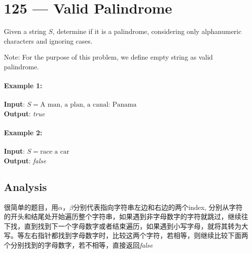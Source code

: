 \section{125 --- Valid Palindrome}
Given a string $S$, determine if it is a palindrome, considering only alphanumeric characters and ignoring cases.
\par
Note: For the purpose of this problem, we define empty string as valid palindrome.
\paragraph{Example 1:}
\begin{flushleft}
\textbf{Input}: $S=\text{A man, a plan, a canal: Panama}$
\\
\textbf{Output}: \textit{true}
\end{flushleft}
\paragraph{Example 2:}
\begin{flushleft}
\textbf{Input}: $S=\text{race a car}$
\\
\textbf{Output}: \textit{false}
\end{flushleft}
\subsection{Analysis}
\begin{CJK*}{UTF8}{gbsn}
很简单的题目，用$\alpha$，$\beta$分别代表指向字符串左边和右边的两个index, 分别从字符的开头和结尾处开始遍历整个字符串，如果遇到非字母数字的字符就跳过，继续往下找，直到找到下一个字母数字或者结束遍历，如果遇到小写字母，就将其转为大写。等左右指针都找到字母数字时，比较这两个字符，若相等，则继续比较下面两个分别找到的字母数字，若不相等，直接返回\textit{false}
\end{CJK*}
